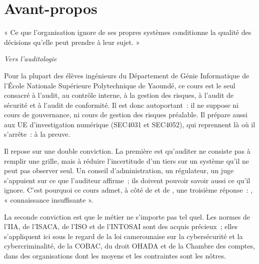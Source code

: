 
\chapter*{Avant-propos}

\epigraph{« Ce que l'organisation ignore de ses propres systèmes conditionne
la qualité des décisions qu'elle peut prendre à leur sujet. »}%
{\textit{Vers l'auditologie}~\cite{minka2026auditologie}}

Pour la plupart des élèves ingénieurs du Département de Génie Informatique
de l'École Nationale Supérieure Polytechnique de Yaoundé, ce cours est le
seul consacré à l'audit, au contrôle interne, à la gestion des risques, à
l'audit de sécurité et à l'audit de conformité. Il est donc
autoportant~: il ne suppose ni cours de gouvernance, ni cours de gestion
des risques préalable. Il prépare aussi aux UE d'investigation numérique
(SEC4031 et SEC4052), qui reprennent là où il s'arrête~: à la preuve.

Il repose sur une double conviction. La première est qu'auditer ne consiste
pas à remplir une grille, mais à réduire l'incertitude d'un tiers sur un
système qu'il ne peut pas observer seul. Un conseil d'administration, un
régulateur, un juge s'appuient sur ce que l'auditeur affirme~; ils doivent
pouvoir savoir aussi ce qu'il ignore. C'est pourquoi ce cours admet, à côté
de \OUI{} et de \NON{}, une troisième réponse~: \NEK{}, « connaissance
insuffisante ».

La seconde conviction est que le métier ne s'importe pas tel quel. Les
normes de l'IIA, de l'ISACA, de l'ISO et de l'INTOSAI sont des acquis
précieux~; elles s'appliquent ici sous le regard de la loi camerounaise sur
la cybersécurité et la cybercriminalité, de la COBAC, du droit OHADA et de
la Chambre des comptes, dans des organisations dont les moyens et les
contraintes sont les nôtres.

\bigskip

